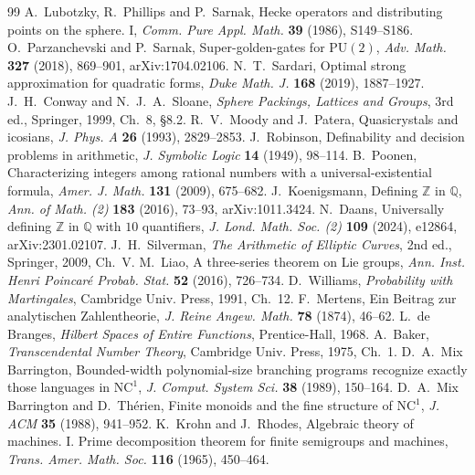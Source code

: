 \documentclass[11pt,reqno]{amsart}
\theoremstyle{definition}
\theoremstyle{remark}
\numberwithin{equation}{section}
\begin{document}
\begin{thebibliography}{99}
 A.~Lubotzky, R.~Phillips and P.~Sarnak, Hecke operators and distributing points on the sphere. I, \emph{Comm. Pure Appl. Math.} \textbf{39} (1986), S149--S186.
 O.~Parzanchevski and P.~Sarnak, Super-golden-gates for \(\mathrm{PU}(2)\), \emph{Adv. Math.} \textbf{327} (2018), 869--901, arXiv:1704.02106.
 N.~T.~Sardari, Optimal strong approximation for quadratic forms, \emph{Duke Math. J.} \textbf{168} (2019), 1887--1927.
 J.~H.~Conway and N.~J.~A.~Sloane, \emph{Sphere Packings, Lattices and Groups}, 3rd ed., Springer, 1999, Ch.~8, \S8.2.
 R.~V.~Moody and J.~Patera, Quasicrystals and icosians, \emph{J. Phys. A} \textbf{26} (1993), 2829--2853.
 J.~Robinson, Definability and decision problems in arithmetic, \emph{J. Symbolic Logic} \textbf{14} (1949), 98--114.
 B.~Poonen, Characterizing integers among rational numbers with a universal-existential formula, \emph{Amer. J. Math.} \textbf{131} (2009), 675--682.
 J.~Koenigsmann, Defining \(\mathbb Z\) in \(\mathbb Q\), \emph{Ann. of Math. (2)} \textbf{183} (2016), 73--93, arXiv:1011.3424.
 N.~Daans, Universally defining \(\mathbb Z\) in \(\mathbb Q\) with \(10\) quantifiers, \emph{J. Lond. Math. Soc. (2)} \textbf{109} (2024), e12864, arXiv:2301.02107.
 J.~H.~Silverman, \emph{The Arithmetic of Elliptic Curves}, 2nd ed., Springer, 2009, Ch.~V.
 M.~Liao, A three-series theorem on Lie groups, \emph{Ann. Inst. Henri Poincar\'e Probab. Stat.} \textbf{52} (2016), 726--734.
 D.~Williams, \emph{Probability with Martingales}, Cambridge Univ. Press, 1991, Ch.~12.
 F.~Mertens, Ein Beitrag zur analytischen Zahlentheorie, \emph{J. Reine Angew. Math.} \textbf{78} (1874), 46--62.
 L.~de Branges, \emph{Hilbert Spaces of Entire Functions}, Prentice-Hall, 1968.
 A.~Baker, \emph{Transcendental Number Theory}, Cambridge Univ. Press, 1975, Ch.~1.
 D.~A.~Mix Barrington, Bounded-width polynomial-size branching programs recognize exactly those languages in \(\mathrm{NC}^1\), \emph{J. Comput. System Sci.} \textbf{38} (1989), 150--164.
 D.~A.~Mix Barrington and D.~Th\'erien, Finite monoids and the fine structure of \(\mathrm{NC}^1\), \emph{J. ACM} \textbf{35} (1988), 941--952.
 K.~Krohn and J.~Rhodes, Algebraic theory of machines. I. Prime decomposition theorem for finite semigroups and machines, \emph{Trans. Amer. Math. Soc.} \textbf{116} (1965), 450--464.

\end{thebibliography}
\end{document}
